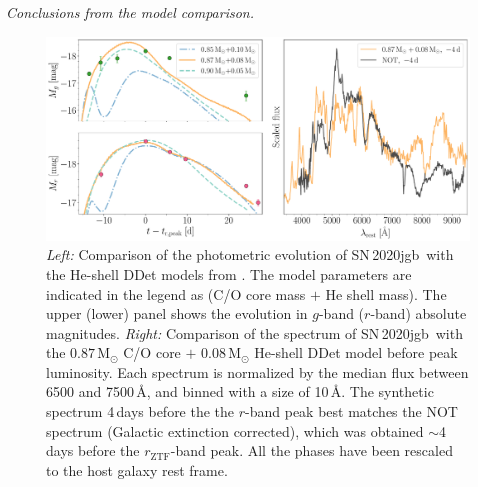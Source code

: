 \documentclass[twocolumn]{aastex631}
\newcommand{\sn}{SN\,2020jgb}
\begin{document}
{\it Conclusions from the model comparison.}

\begin{figure}
    \centering
    \includegraphics[width=\textwidth]{model.pdf}
    \caption{{\it Left:} Comparison of the photometric evolution of \sn\ with the He-shell DDet models from \citet{polin_observational_2019}. The model parameters are indicated in the legend as (C/O core mass $+$ He shell mass). The upper (lower) panel shows the evolution in $g$-band ($r$-band) absolute magnitudes. {\it Right:} Comparison of the spectrum of \sn\ with the $0.87\,\mathrm{M_\odot}$ C/O core $+$ $0.08\,\mathrm{M_\odot}$ He-shell DDet model before peak luminosity. Each spectrum is normalized by the median flux between 6500 and 7500\,\r{A}, and binned with a size of 10\,\r{A}. The synthetic spectrum 4\,days before the the $r$-band peak best matches the NOT spectrum (Galactic extinction corrected), which was obtained $\sim$4\,days before the $r_\mathrm{ZTF}$-band peak. All the phases have been rescaled to the host galaxy rest frame.}
    \label{fig:model}
\end{figure}
\end{document}
